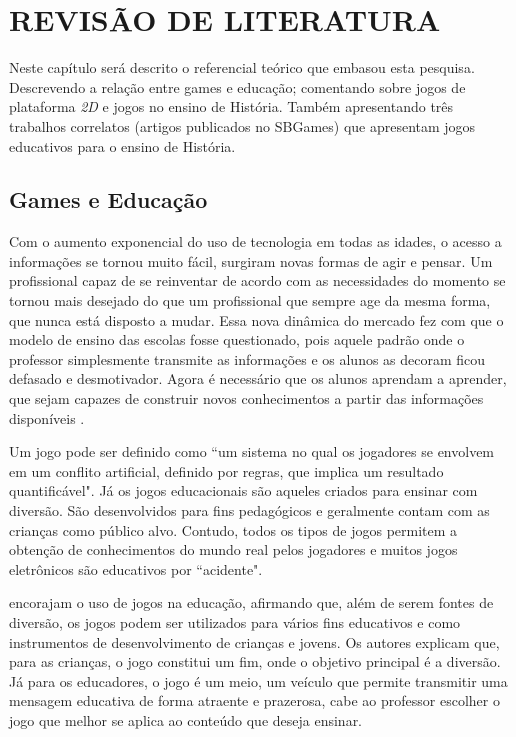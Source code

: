 
\chapter{REVISÃO DE LITERATURA}
\label{chap:fundamentacao-teorica}

Neste capítulo será descrito o referencial teórico que embasou esta pesquisa. Descrevendo a relação entre games e educação; comentando sobre jogos de plataforma \textit{2D} e jogos no ensino de História. Também apresentando três trabalhos correlatos (artigos publicados no SBGames) que apresentam jogos educativos para o ensino de História.

\section{Games e Educação}
\label{sec:gameseeducacao}

Com o aumento exponencial do uso de tecnologia em todas as idades, o acesso a informações se tornou muito fácil, surgiram novas formas de agir e pensar. Um profissional capaz de se reinventar de acordo com as necessidades do momento se tornou mais desejado do que um profissional que sempre age da mesma forma, que nunca está disposto a mudar. Essa nova dinâmica do mercado fez com que o modelo de ensino das escolas fosse questionado, pois aquele padrão onde o professor simplesmente transmite as informações e os alunos as decoram ficou defasado e desmotivador. Agora é necessário que os alunos aprendam a aprender, que sejam capazes de construir novos conhecimentos a partir das informações disponíveis \cite{bib:medeiros2012}.

Um jogo pode ser definido como ``um sistema no qual os jogadores se envolvem em um conflito artificial, definido por regras, que implica um resultado quantificável"\space\cite{bib:salen2012}. Já os jogos educacionais são aqueles criados para ensinar com diversão. São desenvolvidos para fins pedagógicos e geralmente contam com as crianças como público alvo. Contudo, todos os tipos de jogos permitem a obtenção de conhecimentos do mundo real pelos jogadores e muitos jogos eletrônicos são educativos por ``acidente"\space\cite{bib:novak2010}.

 encorajam o uso de jogos na educação, afirmando que, além de serem fontes de diversão, os jogos podem ser utilizados para vários fins educativos e como instrumentos de desenvolvimento de crianças e jovens. Os autores explicam que, para as crianças, o jogo constitui um fim, onde o objetivo principal é a diversão. Já para os educadores, o jogo é um meio, um veículo que permite transmitir uma mensagem educativa de forma atraente e prazerosa, cabe ao professor escolher o jogo que melhor se aplica ao conteúdo que deseja ensinar.

